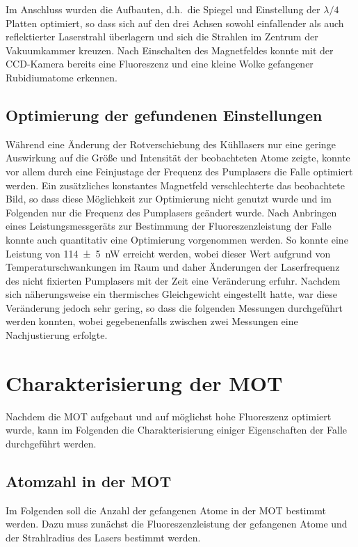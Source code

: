 \documentclass[11pt, a4paper]{article}
\numberwithin{equation}{section}
\begin{document}
Im Anschluss wurden die Aufbauten, d.h.\ die Spiegel und Einstellung der $\lambda/4$ Platten optimiert, so dass sich auf den drei Achsen sowohl einfallender als auch reflektierter Laserstrahl überlagern und sich die Strahlen im Zentrum der Vakuumkammer kreuzen.
Nach Einschalten des Magnetfeldes konnte mit der CCD-Kamera bereits eine Fluoreszenz und eine kleine Wolke gefangener Rubidiumatome erkennen.

\subsection{Optimierung der gefundenen Einstellungen}

Während eine Änderung der Rotverschiebung des Kühllasers nur eine geringe Auswirkung auf die Größe und Intensität der beobachteten Atome zeigte, konnte vor allem durch eine Feinjustage der Frequenz des Pumplasers die Falle optimiert werden.
Ein zusätzliches konstantes Magnetfeld verschlechterte das beobachtete Bild, so dass diese Möglichkeit zur Optimierung nicht genutzt wurde und im Folgenden nur die Frequenz des Pumplasers geändert wurde.
Nach Anbringen eines Leistungsmessgeräts zur Bestimmung der Fluoreszenzleistung der Falle konnte auch quantitativ eine Optimierung vorgenommen werden.
So konnte eine Leistung von \SI{114 +- 5}{nW} erreicht werden, wobei dieser Wert aufgrund von Temperaturschwankungen im Raum und daher Änderungen der Laserfrequenz des nicht fixierten Pumplasers mit der Zeit eine Veränderung erfuhr.
Nachdem sich näherungsweise ein thermisches Gleichgewicht eingestellt hatte, war diese Veränderung jedoch sehr gering, so dass die folgenden Messungen durchgeführt werden konnten, wobei gegebenenfalls zwischen zwei Messungen eine Nachjustierung erfolgte.

\section{Charakterisierung der MOT}
\label{sec:charakterisierung_mot}
Nachdem die MOT aufgebaut und auf möglichst hohe Fluoreszenz optimiert wurde, kann im Folgenden die Charakterisierung einiger Eigenschaften der Falle durchgeführt werden.

\subsection{Atomzahl in der MOT}
Im Folgenden soll die Anzahl der gefangenen Atome in der MOT bestimmt werden.
Dazu muss zunächst die Fluoreszenzleistung der gefangenen Atome und der Strahlradius des Lasers bestimmt werden.
\end{document}
